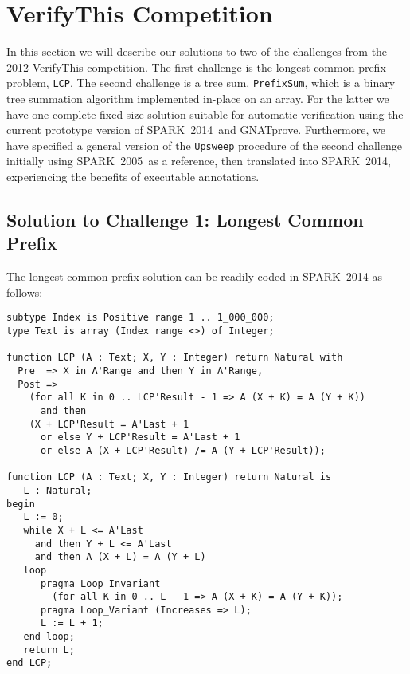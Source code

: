 \documentclass[sttt,draft]{svjour}
\newcommand{\gnatprove}{GNATprove\xspace}
\newcommand{\oldspark}{SPARK~2005\xspace}
\newcommand{\newspark}{SPARK~2014\xspace}
\begin{document}
\section{VerifyThis Competition}
\label{verifythis}
In this section we will describe our solutions to two of the
challenges from the 2012 VerifyThis competition. The first challenge
is the longest common prefix problem, \verb|LCP|. The second challenge
is a tree sum, \verb|PrefixSum|, which is a binary tree summation
algorithm implemented in-place on an array. For the latter we have one
complete fixed-size solution suitable for automatic verification using
the current prototype version of \newspark\ and
\gnatprove. Furthermore, we have specified a general version of the
\verb|Upsweep| procedure of the second challenge initially using
\oldspark\ as a reference, then translated into \newspark,
experiencing the benefits of executable annotations.
\subsection{Solution to Challenge 1: Longest Common Prefix}

The longest common prefix solution can be readily coded in \newspark as follows:

\begin{footnotesize}
\begin{verbatim}
subtype Index is Positive range 1 .. 1_000_000;
type Text is array (Index range <>) of Integer;

function LCP (A : Text; X, Y : Integer) return Natural with
  Pre  => X in A'Range and then Y in A'Range,
  Post =>
    (for all K in 0 .. LCP'Result - 1 => A (X + K) = A (Y + K))
      and then
    (X + LCP'Result = A'Last + 1
      or else Y + LCP'Result = A'Last + 1
      or else A (X + LCP'Result) /= A (Y + LCP'Result));

function LCP (A : Text; X, Y : Integer) return Natural is
   L : Natural;
begin
   L := 0;
   while X + L <= A'Last
     and then Y + L <= A'Last
     and then A (X + L) = A (Y + L)
   loop
      pragma Loop_Invariant
        (for all K in 0 .. L - 1 => A (X + K) = A (Y + K));
      pragma Loop_Variant (Increases => L);
      L := L + 1;
   end loop;
   return L;
end LCP;
\end{verbatim}
\end{footnotesize}
\end{document}
